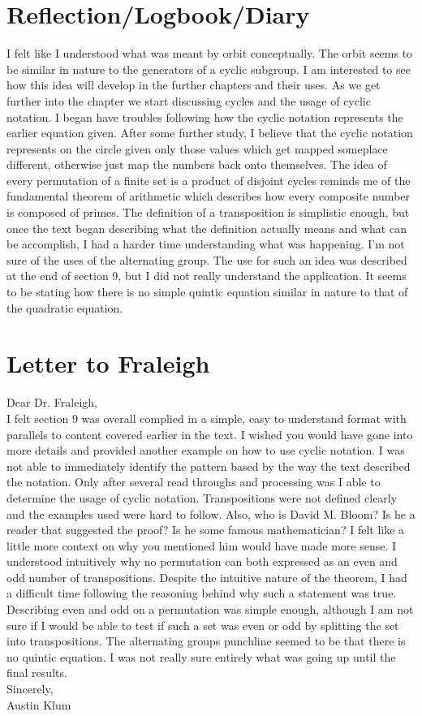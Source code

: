 \documentclass[11pt]{article}
\theoremstyle{plain}
\theoremstyle{definition}
\begin{document}
\section{Reflection/Logbook/Diary}
I felt like I understood what was meant by orbit conceptually. The orbit seems to be similar in nature to the generators of a cyclic subgroup. I am interested to see how this idea will develop in the further chapters and their uses. As we get further into the chapter we start discussing cycles and the usage of cyclic notation. I began have troubles following how the cyclic notation represents the earlier equation given. After some further study, I believe that the cyclic notation represents on the circle given only those values which get mapped someplace different, otherwise just map the numbers back onto themselves. The idea of every permutation of a finite set is a product of disjoint cycles reminds me of the fundamental theorem of arithmetic which describes how every composite number is composed of primes. The definition of a transposition is simplistic enough, but once the text began describing what the definition actually means and what can be accomplish, I had a harder time understanding what was happening. I'm not sure of the uses of the alternating group. The use for such an idea was described at the end of section 9, but I did not really understand the application. It seems to be stating how there is no simple quintic equation similar in nature to that of the quadratic equation.

\section{Letter to Fraleigh}
Dear Dr. Fraleigh,\\ 
 I felt section 9 was overall complied in a simple, easy to understand format with parallels to content covered earlier in the text. I wished you would have gone into more details and provided another example on how to use cyclic notation. I was not able to immediately identify the pattern based by the way the text described the notation. Only after several read throughs and processing was I able to determine the usage of cyclic notation. Transpositions were not defined clearly and the examples used were hard to follow. Also, who is David M. Bloom? Is he a reader that suggested the proof? Is he some famous mathematician? I felt like a little more context on why you mentioned him would have made more sense. I understood intuitively why no permutation can both expressed as an even and odd number of transpositions. Despite the intuitive nature of the theorem, I had a difficult time following the reasoning behind why such a statement was true. Describing even and odd on a permutation was simple enough, although I am not sure if I would be able to test if such a set was even or odd by splitting the set into transpositions. The alternating groups punchline seemed to be that there is no quintic equation. I was not really sure entirely what was going up until the final results.
\\
Sincerely,\\
Austin Klum
\end{document}
